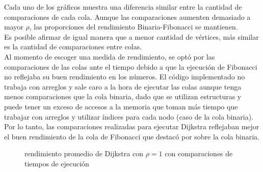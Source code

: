 \documentclass[11pt]{article}
\begin{document}
Cada uno de los gráficos muestra una diferencia similar entre la cantidad de comparaciones de cada cola. Aunque las comparaciones aumenten demasiado a mayor $\rho$, las proporciones del rendimiento Binaria-Fibonacci se mantienen.\\

Es posible afirmar de igual manera que a menor cantidad de vértices, más similar es la cantidad de comparaciones entre colas. \\


Al momento de escoger una medida de rendimiento, se optó por las comparaciones de las colas ante el tiempo debido a que la ejecución de Fibonacci no reflejaba su buen rendimiento en los números. El código implementado no trabaja con arreglos y sale caro a la hora de ejecutar las colas aunque tenga menos comparaciones que la cola binaria, dado que se utilizan estructuras y puede tener un exceso de accesos a la memoria que toman más tiempo que trabajar con arreglos y utilizar índices para cada nodo (caso de la cola binaria). Por lo tanto, las comparaciones realizadas para ejecutar Dijkstra reflejaban mejor el buen rendimiento de la cola de Fibonacci que destacó por sobre la cola binaria.\\

\begin{figure}[h!]
        \centering
        \caption{rendimiento promedio de Dijkstra con $\rho = 1$ con comparaciones de tiempos de ejecución}
        \label{fig:grafico6}
    \end{figure}
\end{document}
